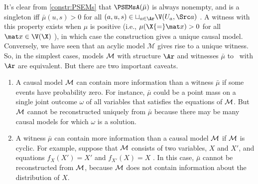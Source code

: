 It's clear from \cref{constr:PSEMs} that
$\PSEMsA(\bar\mu)$ 
is always nonempty, and is a singleton
iff $\bar\mu(u,s) > 0$ for all $(a,u,s) \in \sqcup_{a \in \Ar} \V(U_a, \Src a)$
\unskip.
A witness with this property exists when
$\mu$ is positive (i.e.,
$\mu(\X{=}\mat x) > 0$ for all $\mat x \in \V(\X)$
\unskip), in which case the construction gives a unique causal model.
%
Conversely, we have seen that an acylic model $\mathcal M$ gives rise to a unique witness.
So, in the simplest cases, models
$\cal M$ with structure $\Ar$ and
 witnesses $\bar \mu$ to \cibility\ with $\Ar$
 are equivalent.
But there are two important caveats.
\begin{enumerate}[topsep=0pt,itemsep=0pt]
    \item A causal model $\cal M$ can contain more information than a witness $\bar\mu$ if some events have probability zero. For instance, $\bar\mu$ could be a point mass on a single joint outcome $\omega$ of all variables that satisfies the equations of $\cal M$. But $\cal M$ cannot be reconstructed uniquely from $\bar\mu$ because there may be many causal models for which $\omega$ is a solution. 
    \item A witness $\bar\mu$ can contain more information than a causal model 
    $\cal M$ if $\cal M$ is cyclic. For example, 
    suppose that
    $\cal M$ consists
    of two variables, $X$ and $X'$, and equations $f_X(X') = X'$ and
      $f_{X'}(X) = X$
    \unskip. In this case, $\bar\mu$ cannot be reconstructed from $\cal M$, because $\cal M$ does not contain information about the distribution of $X$. 
\end{enumerate}
